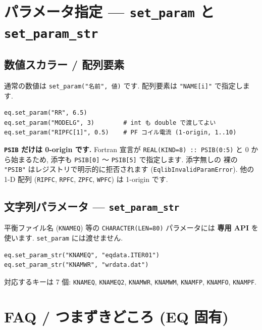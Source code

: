 \documentclass[11pt,a4paper]{report}
\begin{document}
\section{パラメータ指定 — \texttt{set\_param} と \texttt{set\_param\_str}}

\subsection{数値スカラー / 配列要素}

通常の数値は \texttt{set\_param("名前", 値)} です. 配列要素は
\texttt{"NAME[i]"} で指定します.

\begin{lstlisting}[style=py]
eq.set_param("RR", 6.5)
eq.set_param("MODELG", 3)        # int も double で渡してよい
eq.set_param("RIPFC[1]", 0.5)    # PF コイル電流 (1-origin, 1..10)
\end{lstlisting}

\begin{warn}
\textbf{\texttt{PSIB} だけは 0-origin です.} Fortran 宣言が
\texttt{REAL(KIND=8) :: PSIB(0:5)} と 0 から始まるため, 添字も
\texttt{PSIB[0]} 〜 \texttt{PSIB[5]} で指定します. 添字無しの
裸の \texttt{"PSIB"} はレジストリで明示的に拒否されます
(\texttt{EqlibInvalidParamError}). 他の 1-D 配列 (\texttt{RIPFC},
\texttt{RPFC}, \texttt{ZPFC}, \texttt{WPFC}) は 1-origin です.
\end{warn}

\subsection{文字列パラメータ — \texttt{set\_param\_str}}

平衡ファイル名 (\texttt{KNAMEQ}) 等の \texttt{CHARACTER(LEN=80)} パラメータには
\textbf{専用 API} を使います. \texttt{set\_param} には渡せません.

\begin{lstlisting}[style=py]
eq.set_param_str("KNAMEQ", "eqdata.ITER01")
eq.set_param_str("KNAMWR", "wrdata.dat")
\end{lstlisting}

対応するキーは 7 個: \texttt{KNAMEQ}, \texttt{KNAMEQ2},
\texttt{KNAMWR}, \texttt{KNAMWM}, \texttt{KNAMFP}, \texttt{KNAMFO},
\texttt{KNAMPF}.

\section{FAQ / つまずきどころ (EQ 固有)}
\end{document}
